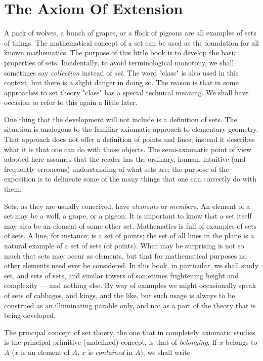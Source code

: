 
\chapter{The Axiom Of Extension} 

	A pack of wolves, a bunch of grapes, or a ffock of pigeons are all examples of sets of things. The mathematical concept of a set can be used as the foundation for all known mathematics. The purpose of this little book is to develop the basic properties of sets. Incidentally, to avoid terminological monotony, we shall sometimes say \textit{collection} instead of \textit{set}. The word "class" is also used in this context, but there is a slight danger in doing so. The reason is that in some approaches to set theory "class" has a special technical meaning. We shall have occasion to refer to this again a little later.


	One thing that the development will not include is a definition of sets. The situation is analogous to the familiar axiomatic approach to elementary geometry. That approach does not offer a definition of points and lines; instead it describes what it is that one can do with those objects. The semi-axiomatic point of view adopted here assumes that the reader has the ordinary, human, intuitive (and frequently erroneous) understanding of what sets are; the purpose of the exposition is to delineate some of the many things that one can correctly do with them.


	Sets, as they are usually conceived, have \textit{elements} or \textit{members}. An element of a set may be a wolf, a grape, or a pigeon. It is important to know that a set itself may also be an element of some other set. Mathematics is full of examples of sets of sets. A line, for instance; is a set of points; the set of all lines in the plane is a natural example of a set of sets (of points). What may be surprising is not so much that sets may occur as elements, but that for mathematical purposes no other elements need ever be considered. In this book, in particular, we shall study set, and sets of sets, and similar towers of sometimes frightening height and complexity — and nothing else. By way of examples we might occasionally speak of sets of cabbages, and kings, and the like, but such usage is always to be construed as an illuminating parable only, and not as a part of the theory that is being developed. 


	The principal concept of set thoery, the one that in completely axiomatic studies is the principal primitive (undefined) concept, is that of \textit{belonging}. If $x$ belongs to $A$ ($x$ is an element of $A$, $x$ is \textit{contained} in $A$), we shall write 

